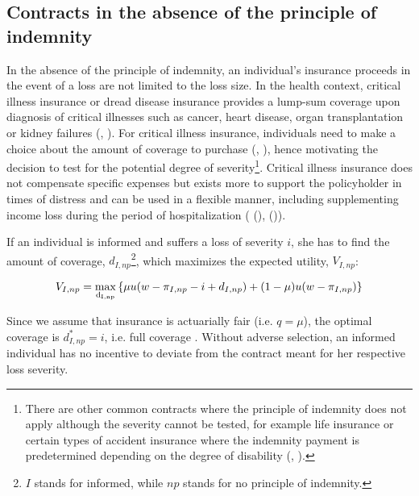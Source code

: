 \documentclass[natbib=false,preprint,12pt]{elsarticle}
\theoremstyle{plain}
\theoremstyle{definition}
\theoremstyle{plain}
\theoremstyle{TheoremNum}
\theoremstyle{CorollaryNum}
\theoremstyle{PropositionNum}
\theoremstyle{TheoremNum}
\begin{document}
\subsection{Contracts in the absence of the principle of indemnity} \label{sev_absence}

In the absence of the principle of indemnity, an individual's insurance proceeds in the event of a loss are not limited to the loss size. In the health context, critical illness insurance or dread disease insurance provides a lump-sum coverage upon diagnosis of critical illnesses such as cancer, heart disease, organ transplantation or kidney failures (\citeauthor{clhia2024flip}, \citeyear{clhia2024flip}). For critical illness insurance, individuals need to make a choice about the amount of coverage to purchase (\citeauthor{bsd2022critical}, \citeyear{bsd2022critical}), hence motivating the decision to test for the potential degree of severity\footnote{There are other common contracts where the principle of indemnity does not apply although the severity cannot be tested, for example life insurance \autocite{swan1981subrogation} or certain types of accident insurance where the indemnity payment is predetermined depending on the degree of disability (\citeauthor{hansemerkur2024gliedertaxe}, \citeyear{hansemerkur2024gliedertaxe}).}. Critical illness insurance does not compensate specific expenses but exists more to support the policyholder in times of distress and can be used in a flexible manner, including supplementing income loss during the period of hospitalization (\citeauthor{li2019effect} (\citeyear{li2019effect}), \citeauthor{zhang2019critical} (\citeyear{zhang2019critical})).  

If an individual is informed and suffers a loss of severity $i$, she has to find the amount of coverage, $d_{I,np}$\footnote{$I$ stands for informed, while $np$ stands for no principle of indemnity.}, which maximizes the expected utility, $V_{I,np}$:

\begin{align}
    V_{I,np} = \underset{\rm d_{I,np}}{\rm max} \left\{\mu u(w-\pi_{I,np}-i+d_{I,np} )+(1-\mu)u(w-\pi_{I,np} )\right\}
\label{informed_np_maxproblem}
\end{align}

Since we assume that insurance is actuarially fair (i.e. $q=\mu$), the optimal coverage is $d_{I,np}^* = i$, i.e. full coverage \autocite{mossin1968aspects}. Without adverse selection, an informed individual has no incentive to deviate from the contract meant for her respective loss severity. 
\end{document}
